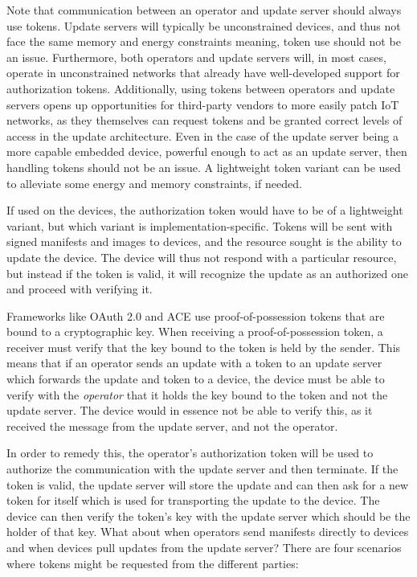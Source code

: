 \documentclass[0-thesis.tex]{subfiles}
\begin{document}
Note that communication between an operator and update server should always use tokens.
Update servers will typically be unconstrained devices, and thus not face the same memory
and energy constraints meaning, token use should not be an issue. Furthermore, both
operators and update servers will, in most cases, operate in unconstrained networks that
already have well-developed support for authorization tokens. Additionally, using tokens
between operators and update servers opens up opportunities for third-party vendors to
more easily patch IoT networks, as they themselves can request tokens and be granted
correct levels of access in the update architecture. Even in the case of the update server
being a more capable embedded device, powerful enough to act as an update server, then
handling tokens should not be an issue. A lightweight token variant can be used to
alleviate some energy and memory constraints, if needed.

If used on the devices, the authorization token would have to be of a lightweight variant,
but which variant is implementation-specific. Tokens will be sent with signed manifests
and images to devices, and the resource sought is the ability to update the device. The
device will thus not respond with a particular resource, but instead if the token is
valid, it will recognize the update as an authorized one and proceed with verifying it.

Frameworks like OAuth 2.0 and ACE use proof-of-possession tokens that are bound to a
cryptographic key. When receiving a proof-of-possession token, a receiver must verify that
the key bound to the token is held by the sender. This means that if an operator sends an
update with a token to an update server which forwards the update and token to a device,
the device must be able to verify with the \textit{operator} that it holds the key bound
to the token and not the update server. The device would in essence not be able to verify
this, as it received the message from the update server, and not the operator.

In order to remedy this, the operator's authorization token will be used to authorize the
communication with the update server and then terminate. If the token is valid, the update
server will store the update and can then ask for a new token for itself which is used for
transporting the update to the device. The device can then verify the token's key with the
update server which should be the holder of that key. What about when operators send
manifests directly to devices and when devices pull updates from the update server? There
are four scenarios where tokens might be requested from the different parties:
\end{document}

